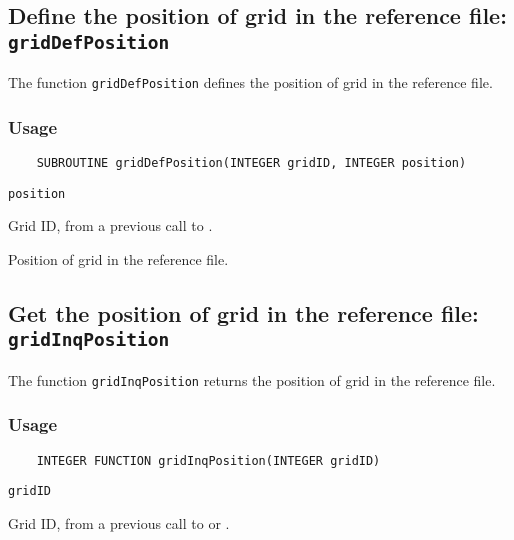 \subsection{Define the position of grid in the reference file: {\tt gridDefPosition}}
\label{gridDefPosition}

The function {\tt gridDefPosition} defines the position of grid in the reference file.

\subsubsection*{Usage}

\begin{verbatim}
    SUBROUTINE gridDefPosition(INTEGER gridID, INTEGER position)
\end{verbatim}

\hspace*{4mm}\begin{minipage}[]{15cm}
\begin{deflist}{\tt position\ }
\item[{\tt gridID}]
Grid ID, from a previous call to {}.
\item[{\tt position}]
Position of grid in the reference file.

\end{deflist}
\end{minipage}


\subsection{Get the position of grid in the reference file: {\tt gridInqPosition}}
\label{gridInqPosition}

The function {\tt gridInqPosition} returns the position of grid in the reference file.

\subsubsection*{Usage}

\begin{verbatim}
    INTEGER FUNCTION gridInqPosition(INTEGER gridID)
\end{verbatim}

\hspace*{4mm}\begin{minipage}[]{15cm}
\begin{deflist}{\tt gridID\ }
\item[{\tt gridID}]
Grid ID, from a previous call to {} or {}.

\end{deflist}
\end{minipage}

